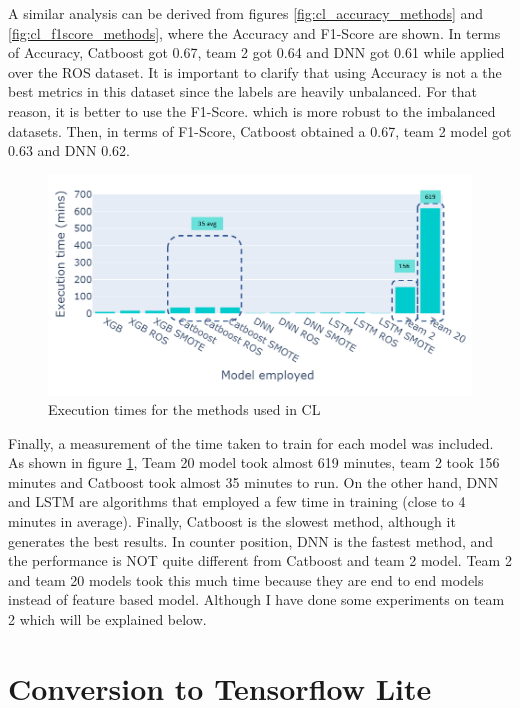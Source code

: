 A similar analysis can be derived from figures \ref{fig:cl_accuracy_methods} and \ref{fig:cl_f1score_methods}, where the Accuracy and F1-Score are shown. In terms of Accuracy, Catboost got 0.67, team 2 got 0.64 and DNN got 0.61 while applied over the ROS dataset. It is important to clarify that using Accuracy is not a the best metrics in this dataset since the labels are heavily unbalanced. For that reason, it is better to use the F1-Score. which is more robust to the imbalanced datasets. Then, in terms of F1-Score, Catboost obtained a 0.67, team 2 model got 0.63 and DNN 0.62.

\begin{figure}[H]
\centering
\includegraphics[scale=0.6]{img/time_cl_teams.png}
\caption{Execution times for the methods used in CL}
\label{fig:times_cl}
\end{figure}

Finally, a measurement of the time taken to train for each model was included. As shown in figure \ref{fig:times_cl}, Team 20 model took almost 619 minutes, team 2 took 156 minutes and Catboost took almost 35 minutes to run. On the other hand, DNN and LSTM are algorithms that employed a few time in training (close to 4 minutes in average). Finally, Catboost is the slowest method, although it generates the best results. In counter position, DNN is the fastest method, and the performance is NOT quite different from Catboost and team 2 model. Team 2 and team 20 models took this much time because they are end to end models instead of feature based model. Although I have done some experiments on team 2 which will be explained below. 


\section{Conversion to Tensorflow Lite } \label{5CTL}

